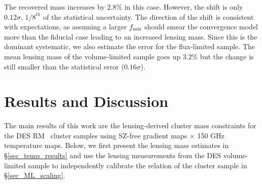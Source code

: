 The recovered mass increases by 2.8\% in this case.
However, the shift is only $0.12\sigma$, $1/8^{th}$ of the statistical uncertainty. %
The direction of the shift is consistent with expectations, as assuming a larger $f_{\rm mis}$ should smear the convergence model more than the fiducial case leading to an increased lensing mass. 
Since this is the dominant systematic, we also estimate the error for the flux-limited sample.
The mean lensing mass of the volume-limited sample goes up 3.2\% but the change is still smaller than the statistical error ($0.16\sigma$). 
  \section{Results and Discussion}\label{mqe_sec_results}

The main results of this work are the lensing-derived cluster mass constraints for the DES RM \whichyear\ cluster samples using \sptpol{} SZ-free gradient maps $\times$ 150 GHz temperature maps.
Below, we first present the lensing mass estimates in \S\ref{sec_temp_results} and use the lensing measurements from the DES \whichyear{} volume-limited sample to independently calibrate the \ML{} relation of the cluster sample in \S\ref{sec_ML_scaling}. 
